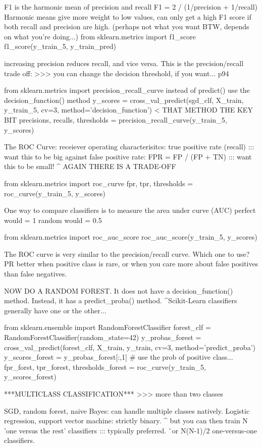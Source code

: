 F1 is the harmonic mean of precision and recall
F1 = 2 / (1/precision + 1/recall)
Harmonic means give more weight to low values,
can only get a high F1 score if both recall and precision are high.
(perhaps not what you want BTW, depends on what you're doing...)
from sklearn.metrics import f1_score
f1_score(y_train_5, y_train_pred)

increasing precision reduces recall, and vice versa.
This is the precision/recall trade off:
>>> you can change the decision threshold, if you want... p94

from sklearn.metrics import precision_recall_curve
instead of predict() use the decision_function() method
y_scores = cross_val_predict(sgd_clf, X_train, y_train_5, cv=3, method='decision_function') < THAT METHOD THE KEY BIT
precisions, recalls, thresholds = precision_recall_curve(y_train_5, y_scores)

The ROC Curve:
receiever operating characterisitcs:
true positive rate (recall) ::: want this to be big
against false positive rate:
FPR = FP / (FP + TN) ::: want this to be small!
^ AGAIN THERE IS A TRADE-OFF

from sklearn.metrics import roc_curve
fpr, tpr, thresholds = roc_curve(y_train_5, y_scores)

One way to compare classifiers is to measure the area under curve (AUC)
perfect would = 1
random would = 0.5

from sklearn.metrics import roc_auc_score
roc_auc_score(y_train_5, y_scores)

The ROC curve is very similar to the precision/recall curve.
Which one to use?
PR better when positive class is rare,
or when you care more about false positives than false negatives.

NOW DO A RANDOM FOREST.
It does not have a decision_function() method.
Instead, it has a predict_proba() method.
^Scikit-Learn classifiers generally have one or the other...

from sklearn.ensemble import RandomForestClassifier
forest_clf = RandomForestClassifier(random_state=42)
y_probas_forest = cross_val_predict(forest_clf, X_train, y_train, cv=3, method='predict_proba')
y_scores_forest = y_probas_forest[:,1] # use the prob of positive class...
fpr_forst, tpr_forest, thresholds_forest = roc_curve(y_train_5, y_scores_forest)


***MULTICLASS CLASSIFICATION***
>>> more than two classes

SGD, random forest, naive Bayes: can handle multiple classes natively.
Logistic regression, support vector machine: strictly binary.
^ but you can then train N 'one versus the rest' classifiers ::: typically preferred.
^^ or N(N-1)/2 one-versus-one classifiers. 

